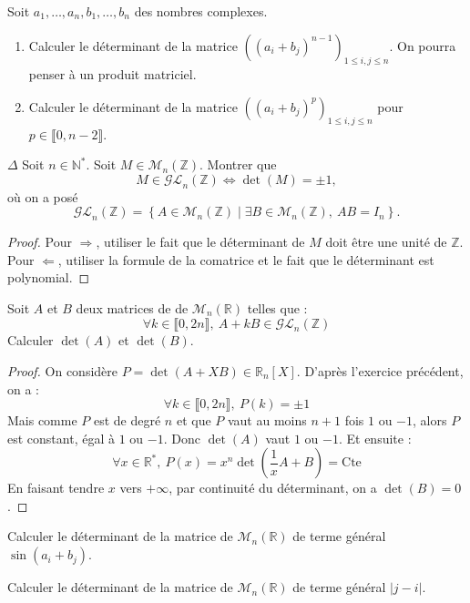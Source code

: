 \documentclass[french,a4paper]{article}
\newcommand{\N}{\mathbb{N}}
\newcommand{\Z}{\mathbb{Z}}
\newcommand{\R}{\mathbb{R}}
\newcommand{\st}{^*}
\theoremstyle{plain}
\theoremstyle{definition}
\theoremstyle{remark}
\begin{document}
\begin{ex}{}
	Soit $a_1,\ldots,a_n,b_1,\ldots,b_n$ des nombres complexes.
	\begin{enumerate}
		\item Calculer le déterminant de la matrice $((a_i+b_j)^{n-1})_{1\leqslant i,j\leqslant n}$. On pourra penser à un produit matriciel.
		\item Calculer le déterminant de la matrice $((a_i+b_j)^{p})_{1\leqslant i,j\leqslant n}$ pour $p\in\llbracket 0,n-2\rrbracket$.
	\end{enumerate}
\end{ex}

\begin{ex}{$\Delta$}
	Soit $n \in \N\st$.
	Soit $M \in \mathcal{M}_n(\Z)$. Montrer que $$ M \in \mathcal{GL}_n(\Z) \Longleftrightarrow \det(M)=\pm 1, $$ où on a posé $$\mathcal{GL}_n(\Z)=\left\{A \in \mathcal{M}_n(\Z) \mid \exists B \in \mathcal{M}_n(\Z), \ AB=I_n\right\}.$$
\end{ex}
\begin{proof}
	Pour $\Longrightarrow$, utiliser le fait que le déterminant de $M$ doit être une unité de $\Z$. Pour $\Longleftarrow$, utiliser la formule de la comatrice et le fait que le déterminant est polynomial.
\end{proof}

\begin{ex}[]{}
	Soit $A$ et $B$ deux matrices de de $\mathcal{M}_n(\R)$ telles que : $$\forall k\in\llbracket0,2n\rrbracket,\ A+kB\in\mathcal{GL}_n(\Z)$$ Calculer $\det(A)$ et $\det(B)$.
\end{ex}
\begin{proof}
	On considère $P=\det(A+XB)\in\R_n[X]$. D'après l'exercice précédent, on a : $$\forall k\in\llbracket0,2n\rrbracket,\ P(k)=\pm1$$ Mais comme $P$ est de degré $n$ et que $P$ vaut au moins $n+1$ fois $1$ ou $-1$, alors $P$ est constant, égal à $1$ ou $-1$. Donc $\det(A)$ vaut $1$ ou $-1$. Et ensuite : $$\forall x\in\R\st,\ P(x)=x^n\det\left(\frac{1}{x}A+B\right)=\text{Cte}$$ En faisant tendre $x$ vers $+\infty$, par continuité du déterminant, on a $\det(B)=0$.
\end{proof}

\begin{ex}{}
	Calculer le déterminant de la matrice de $\mathcal{M}_n(\R)$ de terme général $\sin(a_i+b_j)$.
\end{ex}

\begin{ex}{}
	Calculer le déterminant de la matrice de $\mathcal{M}_n(\R)$ de terme général $\lvert j-i\rvert$.
\end{ex}
\end{document}

